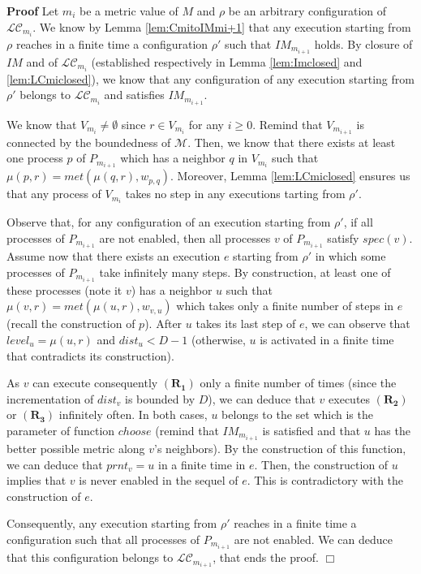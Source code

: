 \documentclass[11pt]{article}
\newenvironment{proof}{\noindent\textbf{Proof}}{\hfill\qed}
\newcommand{\qed}{\hfill$\Box$}
\begin{document}
\begin{proof}
Let $m_i$ be a metric value of $M$ and $\rho$ be an arbitrary configuration of $\mathcal{LC}_{m_i}$. We know by Lemma \ref{lem:CmitoIMmi+1} that any execution starting from $\rho$ reaches in a finite time a configuration $\rho'$ such that $IM_{m_{i+1}}$ holds. By closure of $IM$ and of $\mathcal{LC}_{m_i}$ (established respectively in Lemma \ref{lem:Imclosed} and \ref{lem:LCmiclosed}), we know that any configuration of any execution starting from $\rho'$ belongs to $\mathcal{LC}_{m_i}$ and satisfies $IM_{m_{i+1}}$.

We know that $V_{m_i}\neq\emptyset$ since $r\in V_{m_i}$ for any $i\geq 0$. Remind that $V_{m_{i+1}}$ is connected by the boundedness of $\mathcal{M}$. Then, we know that there exists at least one process $p$ of $P_{m_{i+1}}$ which has a neighbor $q$ in $V_{m_{i}}$ such that $\mu(p,r)=met(\mu(q,r),w_{p,q})$. Moreover, Lemma \ref{lem:LCmiclosed} ensures us that any process of $V_{m_i}$ takes no step in any executions tarting from $\rho'$.

Observe that, for any configuration of an execution starting from $\rho'$, if all processes of $P_{m_{i+1}}$ are not enabled, then all processes $v$ of $P_{m_{i+1}}$ satisfy $spec(v)$. Assume now that there exists an execution $e$ starting from $\rho'$ in which some processes of $P_{m_{i+1}}$ take infinitely many steps. By construction, at least one of these processes (note it $v$) has a neighbor $u$ such that $\mu(v,r)=met(\mu(u,r),w_{v,u})$ which takes only a finite number of steps in $e$ (recall the construction of $p$). After $u$ takes its last step of $e$, we can observe that $level_u=\mu(u,r)$ and $dist_u<D-1$ (otherwise, $u$ is activated in a finite time that contradicts its construction). 

As $v$ can execute consequently $\boldsymbol{(R_1)}$ only a finite number of times (since the incrementation of $dist_v$ is bounded by $D$), we can deduce that $v$ executes $\boldsymbol{(R_2)}$ or $\boldsymbol{(R_3)}$ infinitely often. In both cases, $u$ belongs to the set which is the parameter of function $choose$ (remind that $IM_{m_{i+1}}$ is satisfied and that $u$ has the better possible metric along $v$'s neighbors). By the construction of this function, we can deduce that $prnt_v=u$ in a finite time in $e$. Then, the construction of $u$ implies that $v$ is never enabled in the sequel of $e$. This is contradictory with the construction of $e$.

Consequently, any execution starting from $\rho'$ reaches in a finite time a configuration such that all processes of $P_{m_{i+1}}$ are not enabled. We can deduce that this configuration belongs to $\mathcal{LC}_{m_{i+1}}$, that ends the proof.
\end{proof}
\end{document}
